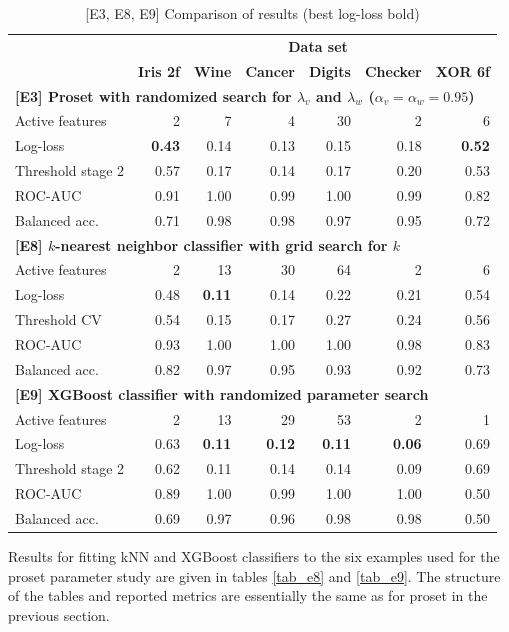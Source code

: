 %
\begin{table}
\caption{[E3, E8, E9] Comparison of results (best log-loss bold)}
\label{tab_e3_e8_e9}
%
\begin{center}
\small
\begin{tabular}{|lrrrrrr|}
\hline
&\multicolumn{6}{c|}{\textbf{\hrulefill\ Data set \hrulefill}}\\
&\textbf{Iris 2f}&\textbf{Wine}&\textbf{Cancer}&\textbf{Digits}&\textbf{Checker}&\textbf{XOR 6f}\\
\multicolumn{7}{|l|}{\textbf{[E3] Proset with randomized search for $\lambda_v$ and $\lambda_w$ ($\alpha_v=\alpha_w=0.95$)}}\\
Active features&2&7&4&30&2&6\\
Log-loss&\textbf{0.43}&0.14&0.13&0.15&0.18&\textbf{0.52}\\
Threshold stage 2&0.57&0.17&0.14&0.17&0.20&0.53\\
ROC-AUC&0.91&1.00&0.99&1.00&0.99&0.82\\
Balanced acc.&0.71&0.98&0.98&0.97&0.95&0.72\\
\multicolumn{7}{|l|}{\textbf{[E8] $k$-nearest neighbor classifier with grid search for $k$}}\\
Active features&2&13&30&64&2&6\\
Log-loss&0.48&\textbf{0.11}&0.14&0.22&0.21&0.54\\
Threshold CV&0.54&0.15&0.17&0.27&0.24&0.56\\
ROC-AUC&0.93&1.00&1.00&1.00&0.98&0.83\\
Balanced acc.&0.82&0.97&0.95&0.93&0.92&0.73\\
\multicolumn{7}{|l|}{\textbf{[E9] XGBoost classifier with randomized parameter search}}\\
Active features&2&13&29&53&2&1\\
Log-loss&0.63&\textbf{0.11}&\textbf{0.12}&\textbf{0.11}&\textbf{0.06}&0.69\\
Threshold stage 2&0.62&0.11&0.14&0.14&0.09&0.69\\
ROC-AUC&0.89&1.00&0.99&1.00&1.00&0.50\\
Balanced acc.&0.69&0.97&0.96&0.98&0.98&0.50\\
\hline
\end{tabular}
\end{center}
\end{table}
%
Results for fitting kNN and XGBoost classifiers to the six examples used for the proset parameter study are given in tables \ref{tab_e8} and \ref{tab_e9}.
The structure of the tables and reported metrics are essentially the same as for proset in the previous section.
